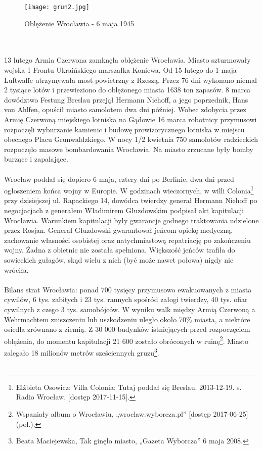 \documentclass[12pt]{article}
\begin{document}
\begin{figure}[h]
    \centering
    \texttt{[image: grun2.jpg]}
    \caption{Oblężenie Wrocławia - 6 maja 1945}
    \label{fig:grun2}
\end{figure}\\\\
13 lutego Armia Czerwona zamknęła oblężenie Wrocławia. Miasto szturmowały wojska 1 Frontu Ukraińskiego marszałka Koniewa. Od 15 lutego do 1 maja Luftwaffe utrzymywała most powietrzny z Rzeszą. Przez 76 dni wykonano niemal 2 tysiące lotów i przewieziono do oblężonego miasta 1638 ton zapasów. 8 marca dowództwo Festung Breslau przejął Hermann Niehoff, a jego poprzednik, Hans von Ahlfen, opuścił miasto samolotem dwa dni później. Wobec zdobycia przez Armię Czerwoną miejskiego lotniska na Gądowie 16 marca robotnicy przymusowi rozpoczęli wyburzanie kamienic i budowę prowizorycznego lotniska w miejscu obecnego Placu Grunwaldzkiego. W nocy 1/2 kwietnia 750 samolotów radzieckich rozpoczęło masowe bombardowania Wrocławia. Na miasto zrzucane były bomby burzące i zapalające.\\\\ 
Wrocław poddał się dopiero 6 maja, cztery dni po Berlinie, dwa dni przed ogłoszeniem końca wojny w Europie. W godzinach wieczornych, w willi Colonia\footnote{Elżbieta Osowicz: Villa Colonia: Tutaj poddał się Breslau. 2013-12-19. s. Radio Wrocław. [dostęp 2017-11-15].} przy dzisiejszej ul. Rapackiego 14, dowódca twierdzy generał Hermann Niehoff po negocjacjach z generałem Władimirem Głuzdowskim podpisał akt kapitulacji Wrocławia. Warunkiem kapitulacji były gwarancje godnego traktowania udzielone przez Rosjan. Generał Głuzdowski gwarantował jeńcom opiekę medyczną, zachowanie własności osobistej oraz natychmiastową repatriację po zakończeniu wojny. Żadna z obietnic nie została spełniona. Większość jeńców trafiła do sowieckich gułagów, skąd wielu z nich (być może nawet połowa) nigdy nie wróciła.\\\\
Bilans strat Wrocławia: ponad 700 tysięcy przymusowo ewakuowanych z miasta cywilów, 6 tys. zabitych i 23 tys. rannych spośród załogi twierdzy, 40 tys. ofiar cywilnych z czego 3 tys. samobójców. W wyniku walk między Armią Czerwoną a Wehrmachtem zniszczeniu lub uszkodzeniu uległo około 70\% miasta, a niektóre osiedla zrównano z ziemią. Z 30 000 budynków istniejących przed rozpoczęciem oblężenia, do momentu kapitulacji 21 600 zostało obróconych w ruinę\footnote{Wspaniały album o Wrocławiu, „wroclaw.wyborcza.pl” [dostęp 2017-06-25] (pol.).}. Miasto zalegało 18 milionów metrów sześciennych gruzu\footnote{Beata Maciejewska, Tak ginęło miasto, „Gazeta Wyborcza” 6 maja 2008.}.\\\\
\end{document}
